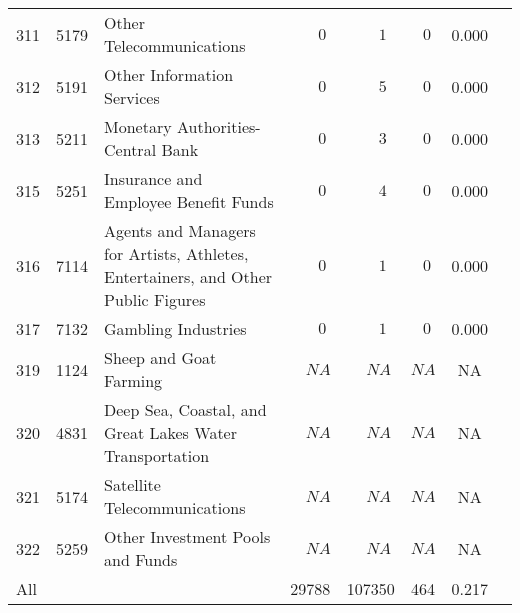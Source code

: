 \documentclass[9pt, oneside]{article}   	%
\begin{document}
\begin{longtable}{lcp{3 in}ccccc}
311  & 5179 & Other Telecommunications & $\phantom{000}0$ & $\phantom{000}1$ & $\phantom{0}0$ & 0.000 \\
312  & 5191 & Other Information Services & $\phantom{000}0$ & $\phantom{000}5$ & $\phantom{0}0$ & 0.000 \\
313  & 5211 & Monetary Authorities-Central Bank & $\phantom{000}0$ & $\phantom{000}3$ & $\phantom{0}0$ & 0.000 \\

315  & 5251 & Insurance and Employee Benefit Funds & $\phantom{000}0$ & $\phantom{000}4$ & $\phantom{0}0$ & 0.000 \\
316  & 7114 & Agents and Managers for Artists, Athletes, Entertainers, and Other Public Figures & $\phantom{000}0$ & $\phantom{000}1$ & $\phantom{0}0$ & 0.000 \\
317  & 7132 & Gambling Industries & $\phantom{000}0$ & $\phantom{000}1$ & $\phantom{0}0$ & 0.000 \\

319  & 1124 & Sheep and Goat Farming & $\phantom{00}NA$ & $\phantom{00}NA$ & $NA$ &    NA \\
320  & 4831 & Deep Sea, Coastal, and Great Lakes Water Transportation & $\phantom{00}NA$ & $\phantom{00}NA$ & $NA$ &    NA \\
321  & 5174 & Satellite Telecommunications & $\phantom{00}NA$ & $\phantom{00}NA$ & $NA$ &    NA \\
322  & 5259 & Other Investment Pools and Funds & $\phantom{00}NA$ & $\phantom{00}NA$ & $NA$ &    NA \\
\cline{1-1} \cline{2-2} \cline{3-3} \cline{4-4} \cline{5-5} \cline{6-6} \cline{7-7} \cline{8-8} %

All  &   &  & 29788   &107350 &  464&  0.217 &  &  \\
\hline 
\end{longtable}




\pagebreak
\end{document}
